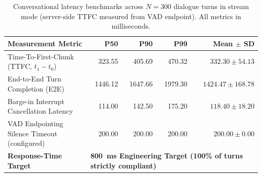 \documentclass[review,12pt,times,authoryear]{elsarticle}
\theoremstyle{definition}
\begin{document}
\begin{table}[t]
\centering
\small
\setlength{\tabcolsep}{3.5pt}
\renewcommand{\arraystretch}{1.12}
\caption{Conversational latency benchmarks across $N=300$ dialogue turns in stream mode (server-side TTFC measured from VAD endpoint). All metrics in milliseconds.}
\label{tab:latency}
\begin{tabularx}{\columnwidth}{@{}Xrrrr@{}}
\toprule
\textbf{Measurement Metric} & \textbf{P50} & \textbf{P90} & \textbf{P99} & \textbf{Mean $\pm$ SD} \\
\midrule
Time-To-First-Chunk (TTFC, $t_1 - t_0$) & 323.55 & 405.69 & 470.32 & $332.30 \pm 54.13$ \\
End-to-End Turn Completion (E2E)        & 1446.12 & 1647.66 & 1979.30 & $1424.47 \pm 168.78$ \\
Barge-in Interrupt Cancellation Latency & 114.00 & 142.50 & 175.20 & $118.40 \pm 18.20$ \\
VAD Endpointing Silence Timeout (configured) & 200.00 & 200.00 & 200.00 & $200.00 \pm 0.00$ \\
\midrule
\textbf{Response-Time Target}   & \multicolumn{4}{l}{\textbf{\SI{800}{\milli\second} Engineering Target (100\% of turns strictly compliant)}} \\
\bottomrule
\end{tabularx}
\end{table}
\end{document}
